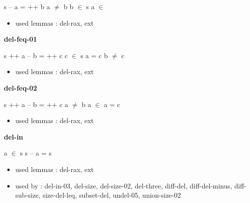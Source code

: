 \documentclass[a4paper]{article}
\begin{document}
 \Fol s -- a =  ++ b \Imp a $\neq$ b \And b $\in$ s \And \Not a $\in$ 

\begin{itemize}


\item       used lemmas  : del-rax, ext

\end{itemize}

\medskip

\bigskip

{\large\bf del-feq-01}

\medskip

 \Fol s ++ a -- b =  ++ c \And \Not c $\in$ s \Imp a = c \And b $\neq$ c

\begin{itemize}


\item       used lemmas  : del-rax, ext

\end{itemize}

\medskip

\bigskip

{\large\bf del-feq-02}

\medskip

 \Fol s ++ a -- b =  ++ c \And a $\neq$ b \And \Not a $\in$  \Imp a = c

\begin{itemize}


\item       used lemmas  : del-rax, ext

\end{itemize}

\medskip

\bigskip

{\large\bf del-in}

\medskip

 \Fol \Not a $\in$ s \Imp s -- a = s

\begin{itemize}


\item       used lemmas  : del-rax, ext
\item       used by      : del-in-03, del-size, del-size-02, del-three, diff-del, diff-del-minus, diff-sub-size, size-del-leq, subset-del, undel-05, union-size-02

\end{itemize}

\medskip
\end{document}
